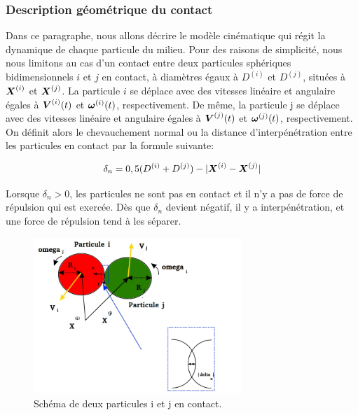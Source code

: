 \subsubsection{Description géométrique du contact}

Dans ce paragraphe, nous allons décrire le modèle cinématique qui régit la dynamique de chaque particule du milieu. Pour des raisons de simplicité, nous nous limitons au cas d'un contact entre deux particules sphériques bidimensionnels $i$ et $j$ en contact, à diamètres égaux à $D^{(i)}$ et $D^{(j)}$, situées à $\boldsymbol{X}^{(i)}$ et $\boldsymbol{X}^{(j)}$. La particule $i$ se déplace avec des vitesses linéaire et angulaire égales à $\boldsymbol{V}^{(i)}(t)$ et $\boldsymbol{\omega}^{(i)}(t)$, respectivement. De même, la particule j se déplace avec des vitesses linéaire et angulaire égales à $\boldsymbol{V}^{(j)}(t)$ et $\boldsymbol{\omega}^{(j)}(t)$, respectivement. On définit alors le chevauchement normal ou la distance d'interpénétration entre les particules en contact par la formule suivante:

\begin{equation} \label{eq: 1}
\delta_n = 0,5 (D^{(i)} + D^{(j)}) - |\boldsymbol{X}^{(i)} - \boldsymbol{X}^{(j)}|
\end{equation}

\noindent Lorsque $\delta_n > 0$, les particules ne sont pas en contact et il n'y a pas de force de répulsion qui est exercée. Dès que $\delta_n$ devient négatif, il y a interpénétration, et une force de répulsion tend à les séparer.

\begin{figure}[!h]
        \centering
        \includegraphics[width=0.7\textwidth]{chapitres/chapitre_4/figures/schematic_2_particles.jpg}
        \caption{Schéma de deux particules i et j en contact.}
        \label{fig1}    
    \end{figure}


